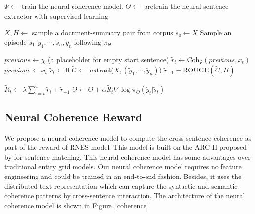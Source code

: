 \begin{algorithm}[t]
		\small
		\begin{algorithmic}[1]
			\State $\Psi \leftarrow$ train the neural coherence model.
			\State $\Theta \leftarrow$ pretrain the neural sentence extractor with supervised learning.

			\Loop

			\State $X, H \leftarrow$ sample a document-summary pair from corpus \State $\tilde{s}_0 \leftarrow X$
			\State Sample an episode $\tilde{s}_1, \tilde{y}_1, \cdots, \tilde{s}_n, \tilde{y}_n$ following $\pi_{\Theta}$

			\State $previous \leftarrow \chi$ (a placeholder for empty start sentence) 
			\State $\tilde{r}_t \leftarrow \text{Coh}_{\Psi}(previous, x_t)$
			\State $previous \leftarrow x_t$
			\Else
			\State $\tilde{r}_t \leftarrow 0 $
			\EndIf
			\EndFor \State $\tilde{G} \leftarrow$ extract($X, (\tilde{y}_1, \cdots, \tilde{y}_n)$)
			\State $\tilde{r}_{-1} = \text{ROUGE}(\tilde{G}, H)$

			\State $\tilde{R}_t \leftarrow \lambda \sum_{i=t}^{n} \tilde{r}_i + \tilde{r}_{-1}$
			\State $\Theta \leftarrow \Theta + \alpha \tilde{R}_t \nabla \log \pi_{\Theta}(\tilde{y}_t|\tilde{s}_t)$
			\EndFor

			\EndLoop

		\end{algorithmic}
		\caption{Overall training algorithm of RNES model. $\alpha$ is the learning rate, $\chi$ is a placeholder sentence for bootstrapping the coherence score of the first extracted sentence.}
		\label{algo_rnes}
	\end{algorithm}

	\subsection{Neural Coherence Reward}
	\label{ncr}
	We propose a neural coherence model to compute the cross sentence coherence as part of the reward of RNES model. This model is built on the ARC-II proposed by \cite{NIPS2014_hu} for sentence matching. This neural coherence model has some advantages over traditional entity grid models. Our neural coherence model requires no feature engineering and could be trained in an end-to-end fashion. Besides, it uses the distributed text representation which can capture the syntactic and semantic coherence patterns by cross-sentence interaction. The architecture of the neural coherence model is shown in Figure~\ref{coherence}. 

